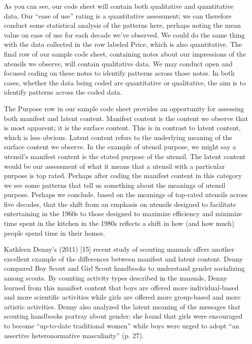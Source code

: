 As you can see, our code sheet will contain both qualitative and quantitative data. Our ``ease of use'' rating is a quantitative assessment; we can therefore conduct some statistical analysis of the patterns here, perhaps noting the mean value on ease of use for each decade we’ve observed. We could do the same thing with the data collected in the row labeled Price, which is also quantitative. The final row of our sample code sheet, containing notes about our impressions of the utensils we observe, will contain qualitative data. We may conduct open and focused coding on these notes to identify patterns across those notes. In both cases, whether the data being coded are quantitative or qualitative, the aim is to identify patterns across the coded data.

The Purpose row in our sample code sheet provides an opportunity for assessing both manifest and latent content. Manifest content is the content we observe that is most apparent; it is the surface content. This is in contrast to latent content, which is less obvious. Latent content refers to the underlying meaning of the surface content we observe. In the example of utensil purpose, we might say a utensil’s manifest content is the stated purpose of the utensil. The latent content would be our assessment of what it means that a utensil with a particular purpose is top rated. Perhaps after coding the manifest content in this category we see some patterns that tell us something about the meanings of utensil purpose. Perhaps we conclude, based on the meanings of top-rated utensils across five decades, that the shift from an emphasis on utensils designed to facilitate entertaining in the 1960s to those designed to maximize efficiency and minimize time spent in the kitchen in the 1980s reflects a shift in how (and how much) people spend time in their homes.

Kathleen Denny’s (2011) [15] recent study of scouting manuals offers another excellent example of the differences between manifest and latent content. Denny compared Boy Scout and Girl Scout handbooks to understand gender socializing among scouts. By counting activity types described in the manuals, Denny learned from this manifest content that boys are offered more individual-based and more scientific activities while girls are offered more group-based and more artistic activities. Denny also analyzed the latent meaning of the messages that scouting handbooks portray about gender; she found that girls were encouraged to become ``up-to-date traditional women'' while boys were urged to adopt ``an assertive heteronormative masculinity'' (p. 27).


